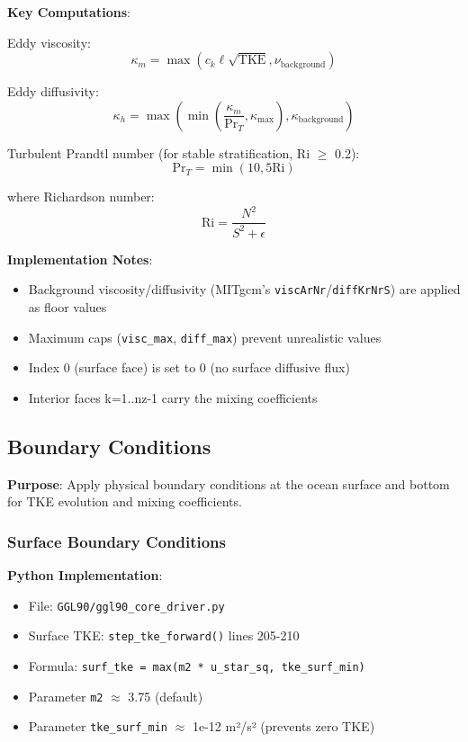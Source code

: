 \documentclass[11pt]{article}
\begin{document}
\textbf{Key Computations}:

Eddy viscosity:
\begin{equation}
\kappa_m = \max\left(c_k \ell \sqrt{\text{TKE}}, \nu_{\text{background}}\right)
\end{equation}

Eddy diffusivity:
\begin{equation}
\kappa_h = \max\left(\min\left(\frac{\kappa_m}{\text{Pr}_T}, \kappa_{\text{max}}\right), \kappa_{\text{background}}\right)
\end{equation}

Turbulent Prandtl number (for stable stratification, Ri $\geq$ 0.2):
\begin{equation}
\text{Pr}_T = \min(10, 5 \text{Ri})
\end{equation}

where Richardson number:
\begin{equation}
\text{Ri} = \frac{N^2}{S^2 + \epsilon}
\end{equation}

\textbf{Implementation Notes}:
\begin{itemize}
    \item Background viscosity/diffusivity (MITgcm's \verb|viscArNr|/\verb|diffKrNrS|) are applied as floor values
    \item Maximum caps (\verb|visc_max|, \verb|diff_max|) prevent unrealistic values
    \item Index 0 (surface face) is set to 0 (no surface diffusive flux)
    \item Interior faces k=1..nz-1 carry the mixing coefficients
\end{itemize}

\subsection{Boundary Conditions}

\textbf{Purpose}: Apply physical boundary conditions at the ocean surface and bottom for TKE evolution and mixing coefficients.

\subsubsection{Surface Boundary Conditions}

\textbf{Python Implementation}:
\begin{itemize}
    \item File: \verb|GGL90/ggl90_core_driver.py|
    \item Surface TKE: \verb|step_tke_forward()| lines 205-210
    \item Formula: \verb|surf_tke = max(m2 * u_star_sq, tke_surf_min)|
    \item Parameter \verb|m2| $\approx$ 3.75 (default)
    \item Parameter \verb|tke_surf_min| $\approx$ 1e-12 m²/s² (prevents zero TKE)
\end{itemize}
\end{document}
